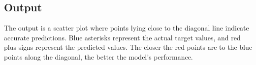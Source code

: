 \documentclass[11pt]{article}
\begin{document}
\subsection*{Output}
The output is a scatter plot where points lying close to the diagonal line indicate accurate predictions. Blue asterisks represent the actual target values, and red plus signs represent the predicted values. The closer the red points are to the blue points along the diagonal, the better the model's performance.
    \begin{center}
    \end{center}
    { \hspace*{\fill} \\}
    
    


    
    
    
\end{document}
